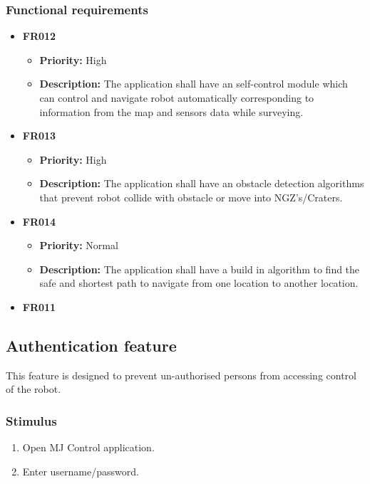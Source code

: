 \documentclass[10pt,a4paper,titlepage]{article}
\begin{document}
	\subsubsection*{Functional requirements}
	\begin{itemize}
		
		
		\item \textbf{FR012} 
		\begin{itemize}
			\item \textbf{Priority:} High
			\item \textbf{Description:} The application shall have an self-control module which can control and navigate robot automatically corresponding to information from the map and sensors data while surveying.
		\end{itemize}
		\item \textbf{FR013} 
		\begin{itemize}
		\item \textbf{Priority:} High
		\item \textbf{Description:} The application shall have an obstacle detection algorithms that prevent robot collide with obstacle or move into NGZ's/Craters.
		\end{itemize}
	
		\item \textbf{FR014} 
		\begin{itemize}
			\item \textbf{Priority:} Normal
			\item \textbf{Description:} The application shall have a build in algorithm to find the safe and shortest path to navigate from one location to another location.
		\end{itemize}
		\item \textbf{FR011}
	
	\end{itemize}
	
	\subsection{Authentication feature }
	\text This feature is designed to prevent un-authorised persons from accessing control of the robot.
	
	\subsubsection*{Stimulus}
	\begin{enumerate}
		\item Open MJ Control application.
		\item Enter username/password.
	\end{enumerate}
	
\end{document}
